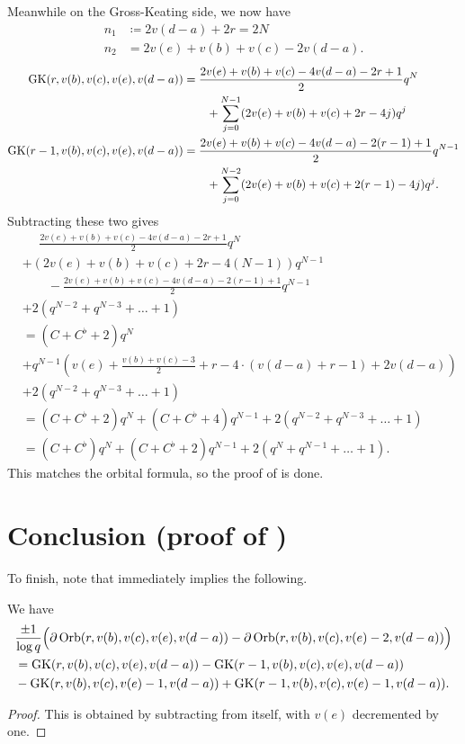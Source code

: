 Meanwhile on the Gross-Keating side, we now have
\begin{align*}
  n_1 &\coloneqq 2v(d-a) + 2r = 2N \\
  n_2 &= 2v(e) + v(b) + v(c) - 2v(d-a).
\end{align*}
\begin{align*}
  \operatorname{GK}(r, v(b), v(c), v(e), v(d-a))
  &= \frac{2v(e)+v(b)+v(c)-4v(d-a)-2r+1}{2} q^{N} \\
    &\qquad+ \sum_{j=0}^{N-1} (2v(e)+v(b)+v(c)+2r-4j) q^j \\
  \operatorname{GK}(r-1, v(b), v(c), v(e), v(d-a))
  &= \frac{2v(e)+v(b)+v(c)-4v(d-a)-2(r-1)+1}{2} q^{N-1} \\
    &\qquad+ \sum_{j=0}^{N-2} (2v(e)+v(b)+v(c)+2(r-1)-4j) q^j.
\end{align*}
Subtracting these two gives
\begin{align*}
  &\phantom= \frac{2v(e)+v(b)+v(c)-4v(d-a)-2r+1}{2} q^{N} \\
  &+ (2v(e)+v(b)+v(c)+2r-4(N-1)) q^{N-1} \\
  &\qquad- \frac{2v(e)+v(b)+v(c)-4v(d-a)-2(r-1)+1}{2} q^{N-1} \\
  &+ 2(q^{N-2} + q^{N-3} + \dots + 1) \\
  &= (C + C^\flat + 2) q^N \\
  &+ q^{N-1} \left( v(e)+\frac{v(b)+v(c)-3}{2} + r - 4 \cdot (v(d-a)+r-1) + 2v(d-a) \right) \\
  &+ 2(q^{N-2} + q^{N-3} + \dots + 1) \\
  &= (C + C^\flat + 2) q^N + (C + C^\flat + 4) q^{N-1} + 2(q^{N-2} + q^{N-3} + \dots + 1) \\
  &= (C + C^\flat) q^N + (C + C^\flat + 2) q^{N-1} + 2(q^N + q^{N-1} + \dots + 1).
\end{align*}
This matches the orbital formula, so the proof of  is done.

\section{Conclusion (proof of )}
To finish, note that  immediately implies the following.
\begin{corollary}
  \label{cor:finale_by_two}
  We have
  \begin{align*}
    &\frac{\pm1}{\log q}\Big(\partial\operatorname{Orb}(r, v(b), v(c), v(e), v(d-a)) - \partial\operatorname{Orb}(r, v(b), v(c), v(e)-2, v(d-a))\Big) \\
    &= \operatorname{GK}(r, v(b), v(c), v(e), v(d-a)) - \operatorname{GK}(r-1, v(b), v(c), v(e), v(d-a)) \\
    &- \operatorname{GK}(r, v(b), v(c), v(e)-1, v(d-a)) + \operatorname{GK}(r-1, v(b), v(c), v(e)-1, v(d-a)).
  \end{align*}
\end{corollary}
\begin{proof}
  This is obtained by subtracting  from itself,
  with $v(e)$ decremented by one.
\end{proof}

